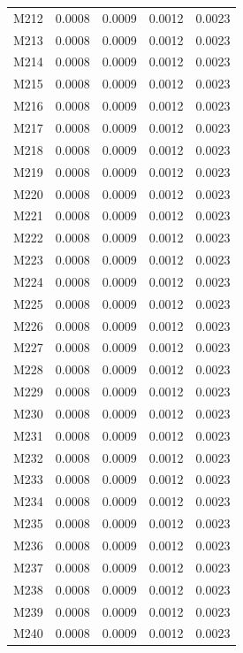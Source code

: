 \begin{longtable}{lrrrr}
M212 & 0.0008 & 0.0009 & 0.0012 & 0.0023 \\
M213 & 0.0008 & 0.0009 & 0.0012 & 0.0023 \\
M214 & 0.0008 & 0.0009 & 0.0012 & 0.0023 \\
M215 & 0.0008 & 0.0009 & 0.0012 & 0.0023 \\
M216 & 0.0008 & 0.0009 & 0.0012 & 0.0023 \\
M217 & 0.0008 & 0.0009 & 0.0012 & 0.0023 \\
M218 & 0.0008 & 0.0009 & 0.0012 & 0.0023 \\
M219 & 0.0008 & 0.0009 & 0.0012 & 0.0023 \\
M220 & 0.0008 & 0.0009 & 0.0012 & 0.0023 \\
M221 & 0.0008 & 0.0009 & 0.0012 & 0.0023 \\
M222 & 0.0008 & 0.0009 & 0.0012 & 0.0023 \\
M223 & 0.0008 & 0.0009 & 0.0012 & 0.0023 \\
M224 & 0.0008 & 0.0009 & 0.0012 & 0.0023 \\
M225 & 0.0008 & 0.0009 & 0.0012 & 0.0023 \\
M226 & 0.0008 & 0.0009 & 0.0012 & 0.0023 \\
M227 & 0.0008 & 0.0009 & 0.0012 & 0.0023 \\
M228 & 0.0008 & 0.0009 & 0.0012 & 0.0023 \\
M229 & 0.0008 & 0.0009 & 0.0012 & 0.0023 \\
M230 & 0.0008 & 0.0009 & 0.0012 & 0.0023 \\
M231 & 0.0008 & 0.0009 & 0.0012 & 0.0023 \\
M232 & 0.0008 & 0.0009 & 0.0012 & 0.0023 \\
M233 & 0.0008 & 0.0009 & 0.0012 & 0.0023 \\
M234 & 0.0008 & 0.0009 & 0.0012 & 0.0023 \\
M235 & 0.0008 & 0.0009 & 0.0012 & 0.0023 \\
M236 & 0.0008 & 0.0009 & 0.0012 & 0.0023 \\
M237 & 0.0008 & 0.0009 & 0.0012 & 0.0023 \\
M238 & 0.0008 & 0.0009 & 0.0012 & 0.0023 \\
M239 & 0.0008 & 0.0009 & 0.0012 & 0.0023 \\
M240 & 0.0008 & 0.0009 & 0.0012 & 0.0023 \\
\end{longtable}
